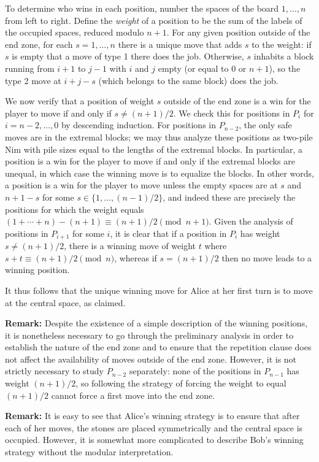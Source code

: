 \documentclass[amssymb,twocolumn,pra,10pt,aps]{revtex4-1}
\begin{document}
\begin{itemize}
To determine who wins in each position, number the spaces of the board $1,\dots,n$ from left to right. Define the \emph{weight} of a position to be the sum of the labels of the occupied spaces, reduced modulo $n+1$. For any given position outside of the end zone, 
for each $s=1,\dots,n$ there is a unique move that adds $s$ to the weight:
if $s$ is empty that a move of type 1 there does the job.
Otherwise, $s$ inhabits a block running from $i+1$ to $j-1$ with $i$ and $j$ empty (or equal to $0$ or $n+1$), so the type 2 move at $i+j-s$ (which belongs to the same block) does the job.

We now verify that a position of weight $s$ outside of the end zone is a win for the player to move if and only if $s \neq (n+1)/2$. We check this for positions in $P_i$ for $i = n-2, \dots, 0$ by descending induction. For positions in $P_{n-2}$, the only safe moves are in the extremal blocks; we may thus analyze these positions as two-pile Nim with pile sizes equal to the lengths of the extremal blocks. In particular, a position is a win for the player to move if and only if the extremal blocks are unequal, in which case the winning move is to equalize the blocks. In other words, a position is a win for the player to move unless the empty spaces are at $s$ and $n+1-s$ for some $s \in \{1,\dots,(n-1)/2\}$, and indeed these are precisely the positions for which the weight equals $(1 + \cdots + n) - (n+1) \equiv (n+1)/2 \pmod{n+1}$.
Given the analysis of positions in $P_{i+1}$ for some $i$, it is clear that if a position in $P_i$ has weight $s \neq (n+1)/2$, there is a winning move of weight $t$ where $s+t \equiv (n+1)/2 \pmod{n}$,
whereas if $s = (n+1)/2$ then no move leads to a winning position.

It thus follows that the unique winning move for Alice at her first turn is to move at the central space, as claimed.

\textbf{Remark:}
Despite the existence of a simple description of the winning positions, it is nonetheless necessary to go through the preliminary analysis in order to establish the nature of the end zone and to ensure that the repetition clause does not affect the availability of moves outside of the end zone. However, it is not strictly necessary to study $P_{n-2}$ separately: none of the positions in $P_{n-1}$ has weight $(n+1)/2$, so following the strategy of forcing the weight to equal $(n+1)/2$ cannot force a first move into the end zone.

\textbf{Remark:}
It is easy to see that Alice's winning strategy is to ensure that after each of her moves, the stones are placed symmetrically and the central space is occupied. However, it is somewhat more complicated to describe Bob's winning strategy without the modular interpretation. 


\end{itemize}
\end{document}
